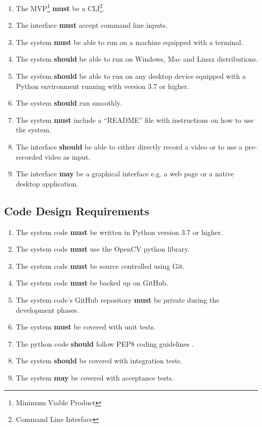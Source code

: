 \begin{enumerate}
    \item The MVP\footnote{Minimum Viable Product} \textbf{must} be a CLI\footnote{Command Line Interface}.
    \item The interface \textbf{must} accept command line inputs.
    \item The system \textbf{must} be able to run on a machine equipped with a terminal.
    \item The system \textbf{should} be able to run on Windows, Mac and Linux distributions.
    \item The system \textbf{should} be able to run on any desktop device equipped with a Python environment running with version 3.7 or higher.
    \item The system \textbf{should} run smoothly.
    \item The system \textbf{must} include a ``README'' file with instructions on how to use the system.
    \item The interface \textbf{should} be able to either directly record a video or to use a pre-recorded video as input.
    \item The interface \textbf{may} be a graphical interface e.g. a web page or a native desktop application.
\end{enumerate}

\subsection{Code Design Requirements}

\begin{enumerate}
    \item The system code \textbf{must} be written in Python version 3.7 or higher.
    \item The system code \textbf{must} use the OpenCV python library.
    \item The system code \textbf{must} be source controlled using Git.
    \item The system code \textbf{must} be backed up on GitHub.
    \item The system code's GitHub repository \textbf{must} be private during the development phases.
    \item The system \textbf{must} be covered with unit tests.
    \item The python code \textbf{should} follow PEP8 coding guidelines \cite{pep8}.
    \item The system \textbf{should} be covered with integration tests.
    \item The system \textbf{may} be covered with acceptance tests.
\end{enumerate}

